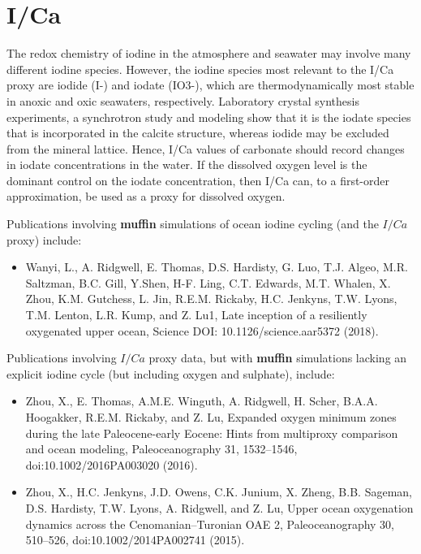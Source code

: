 \documentclass[11pt,fleqn]{book} %
\begin{document}
\section{I/Ca}

The redox chemistry of iodine in the atmosphere and seawater may involve
many different iodine species. However, the iodine species most relevant
to the I/Ca proxy are iodide (I-) and iodate (IO3-), which are
thermodynamically most stable in anoxic and oxic seawaters, respectively.
Laboratory crystal synthesis experiments, a synchrotron study and modeling
show that it is the iodate species that is incorporated in the calcite
structure, whereas iodide may be excluded from the mineral lattice. Hence,
I/Ca values of carbonate should record changes in iodate concentrations in
the water. If the dissolved oxygen level is the dominant control on the
iodate concentration, then I/Ca can, to a first-order approximation, be
used as a proxy for dissolved oxygen.

Publications involving \textbf{muffin} simulations of ocean iodine cycling (and the \(I/Ca\) proxy) include:

\vspace{1mm}
\begin{itemize}[noitemsep]
\item Wanyi, L., A. Ridgwell, E. Thomas, D.S. Hardisty, G. Luo, T.J. Algeo, M.R. Saltzman, B.C. Gill, Y.Shen, H-F. Ling, C.T. Edwards, M.T. Whalen, X. Zhou, K.M. Gutchess, L. Jin, R.E.M. Rickaby, H.C. Jenkyns, T.W. Lyons, T.M. Lenton, L.R. Kump, and Z. Lu1, Late inception of a resiliently oxygenated upper ocean, Science DOI: 10.1126/science.aar5372 (2018).
\end{itemize}
\vspace{1mm}

Publications involving \(I/Ca\) proxy data, but with \textbf{muffin} simulations lacking an explicit iodine cycle (but including oxygen and sulphate), include:

\vspace{1mm}
\begin{itemize}[noitemsep]
\item Zhou, X., E. Thomas, A.M.E. Winguth, A. Ridgwell, H. Scher, B.A.A. Hoogakker, R.E.M. Rickaby, and Z. Lu, Expanded oxygen minimum zones during the late Paleocene-early Eocene: Hints from multiproxy comparison and ocean modeling, Paleoceanography 31, 1532–1546, doi:10.1002/2016PA003020 (2016).
\item Zhou, X., H.C. Jenkyns, J.D. Owens, C.K. Junium, X. Zheng, B.B. Sageman, D.S. Hardisty, T.W. Lyons, A. Ridgwell, and Z. Lu, Upper ocean oxygenation dynamics across the Cenomanian–Turonian OAE 2, Paleoceanography 30, 510–526, doi:10.1002/2014PA002741 (2015).
\end{itemize}
\vspace{1mm}
\end{document}
